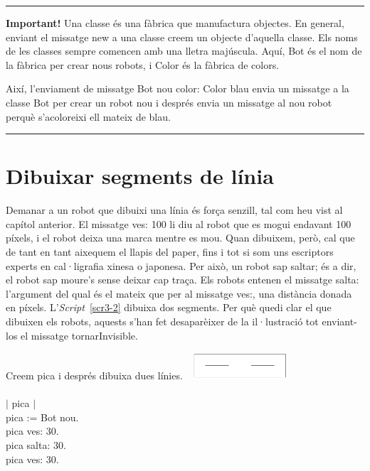 \newpage

\noindent
\rule{\textwidth}{2pt}
\noindent
\textbf{Important!} Una classe és una fàbrica que manufactura objectes. En general, enviant el missatge \textsf{new} a una classe creem un objecte d'aquella classe. Els noms de les classes sempre comencen amb una lletra majúscula. Aquí, \textsf{Bot} és el nom de la fàbrica per crear nous robots, i \textsf{Color} és la fàbrica de colors.

\noindent
Així, l'enviament de missatge \textsf{Bot nou color: Color blau} envia un missatge a la classe \textsf{Bot} per crear un robot nou i després envia un missatge al nou robot perquè s'acoloreixi ell mateix de blau.  

\noindent
\rule{\textwidth}{2pt}

\section{Dibuixar segments de línia}
Demanar a un robot que dibuixi una línia és força senzill, tal com heu vist al capítol anterior. El missatge \textsf{ves: 100} li diu al robot que es mogui endavant 100 píxels, i el robot deixa una marca mentre es mou. Quan dibuixem, però, cal que de tant en tant aixequem el llapis del paper, fins i tot si som uns escriptors experts en cal·ligrafia xinesa o japonesa. Per això, un robot sap saltar; és a dir, el robot sap moure's sense deixar cap traça. Els robots entenen el missatge \textsf{salta:} l'argument del qual és el mateix que per al missatge \textsf{ves:}, una distància donada en píxels. L'\emph{Script}~\ref{scr3-2} dibuixa dos segments. Per què quedi clar el que dibuixen els robots, aquests s'han fet desaparèixer de la il·lustració tot enviant-los el missatge \textsf{tornarInvisible}.

\begin{script}  Creem pica i després dibuixa dues línies.
\newline
\newline
\noindent
\includegraphics[height=10mm ,width=40mm]{Imatges/figuraS3-2.png}
\noindent
\textsf{\upshape
\\
\\$|$ pica $|$\\
pica := Bot nou.\\
pica ves: 30.\\
pica salta: 30.\\
pica ves: 30.\\
}
\label{scr3-2}
\end{script}

